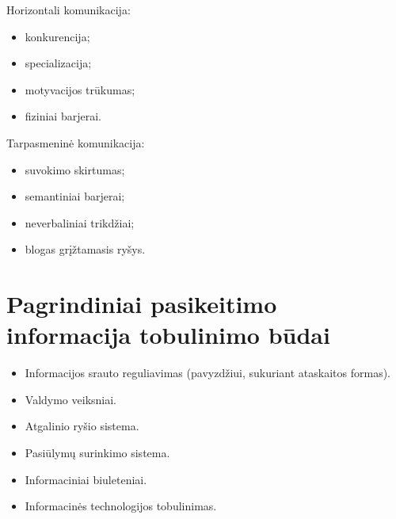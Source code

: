 Horizontali komunikacija:
\begin{itemize}
  \item konkurencija;
  \item specializacija;
  \item motyvacijos trūkumas;
  \item fiziniai barjerai.
\end{itemize}

Tarpasmeninė komunikacija:
\begin{itemize}
  \item suvokimo skirtumas;
  \item semantiniai barjerai;
  \item neverbaliniai trikdžiai;
  \item blogas grįžtamasis ryšys.
\end{itemize}

\section{Pagrindiniai pasikeitimo informacija tobulinimo būdai}

\begin{itemize}
  \item Informacijos srauto reguliavimas (pavyzdžiui, sukuriant ataskaitos
    formas).
  \item Valdymo veiksniai.
  \item Atgalinio ryšio sistema.
  \item Pasiūlymų surinkimo sistema.
  \item Informaciniai biuleteniai.
  \item Informacinės technologijos tobulinimas.
\end{itemize}
